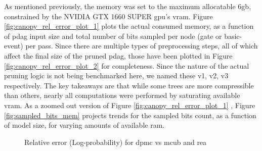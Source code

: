 As mentioned previously, the memory was set to the maximum allocatable 6\acrshort{gb}, constrained by the NVIDIA GTX 1660 SUPER \acrshort{gpu}'s \acrshort{vram}. Figure \ref{fig:canopy_rel_error_plot_1} plots the actual consumed memory, as a function of \acrshort{pdag} input size and total number of bits sampled per node (gate or basic-event) per pass. Since there are multiple types of preprocessing steps, all of which affect the final size of the pruned \acrshort{pdag}, those have been plotted in Figure \ref{fig:canopy_rel_error_plot_2} for completeness. Since the nature of the actual pruning logic is not being benchmarked here, we named these v1, v2, v3 respectively. The key takeaways are that while some trees are more compressible than others, nearly all computations were performed by saturating available \acrshort{vram}. As a zoomed out version of Figure \ref{fig:canopy_rel_error_plot_1} , Figure \ref{fig:sampled_bits_mem} projects trends for the sampled bits count, as a function of model size, for varying amounts of available \acrshort{ram}.
\begin{landscape}
\begin{figure}[p]
    \centering
    
    \caption{Relative error (Log-probability) for \acrfull{dpmc} vs \acrfull{mcub} and \acrfull{rea}}
    \label{fig:canopy_rel_error_plot}
\end{figure}
\end{landscape}

